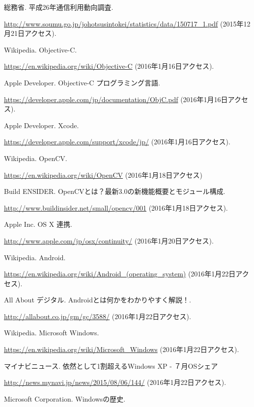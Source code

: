 \def\line{-\hspace*{-.7zw}-}

\begin{thebibliography}{99}

総務省. 平成26年通信利用動向調査.

\url{http://www.soumu.go.jp/johotsusintokei/statistics/data/150717_1.pdf}
(2015年12月21日アクセス).

Wikipedia. Objective-C.

\url{https://en.wikipedia.org/wiki/Objective-C}
(2016年1月16日アクセス).

Apple Developer. Objective-C プログラミング言語.

\url{https://developer.apple.com/jp/documentation/ObjC.pdf}
(2016年1月16日アクセス).

Apple Developer. Xcode.

\url{https://developer.apple.com/support/xcode/jp/}
(2016年1月16日アクセス).

Wikipedia. OpenCV.

\url{https://en.wikipedia.org/wiki/OpenCV}
(2016年1月18日アクセス)

Build ENSIDER. OpenCVとは？最新3.0の新機能概要とモジュール構成.

\url{http://www.buildinsider.net/small/opencv/001}
(2016年1月18日アクセス).

Apple Inc. OS X 連携.

\url{http://www.apple.com/jp/osx/continuity/}
(2016年1月20日アクセス).

Wikipedia. Android.

\url{https://en.wikipedia.org/wiki/Android_(operating_system)}
(2016年1月22日アクセス).

All About デジタル. Androidとは何かをわかりやすく解説！.

\url{http://allabout.co.jp/gm/gc/3588/}
(2016年1月22日アクセス).

Wikipedia. Microsoft Windows.

\url{https://en.wikipedia.org/wiki/Microsoft_Windows}
(2016年1月22日アクセス).

マイナビニュース. 依然として1割超えるWindows XP - ７月OSシェア

\url{http://news.mynavi.jp/news/2015/08/06/144/}
(2016年1月22日アクセス).

Microsoft Corporation. Windowsの歴史.


\end{thebibliography}

